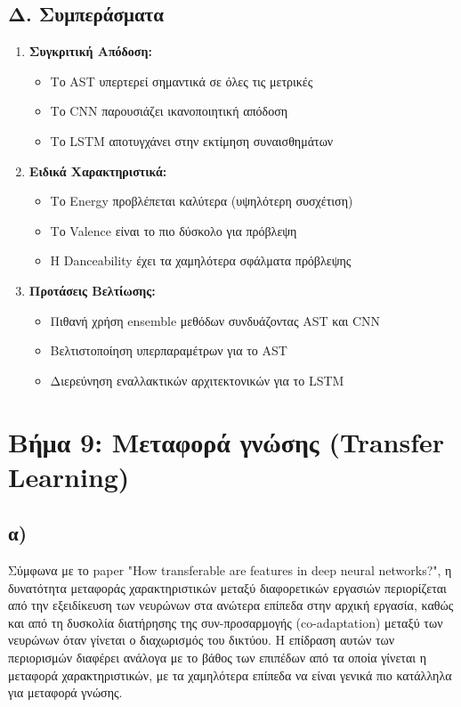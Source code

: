 \documentclass[a4paper,12pt]{article}
\begin{document}
\subsection*{Δ. Συμπεράσματα}

\begin{enumerate}
    \item \textbf{Συγκριτική Απόδοση:}
    \begin{itemize}
        \item Το AST υπερτερεί σημαντικά σε όλες τις μετρικές
        \item Το CNN παρουσιάζει ικανοποιητική απόδοση
        \item Το LSTM αποτυγχάνει στην εκτίμηση συναισθημάτων
    \end{itemize}
    
    \item \textbf{Ειδικά Χαρακτηριστικά:}
    \begin{itemize}
        \item Το Energy προβλέπεται καλύτερα (υψηλότερη συσχέτιση)
        \item Το Valence είναι το πιο δύσκολο για πρόβλεψη
        \item Η Danceability έχει τα χαμηλότερα σφάλματα πρόβλεψης
    \end{itemize}
    
    \item \textbf{Προτάσεις Βελτίωσης:}
    \begin{itemize}
        \item Πιθανή χρήση ensemble μεθόδων συνδυάζοντας AST και CNN
        \item Βελτιστοποίηση υπερπαραμέτρων για το AST
        \item Διερεύνηση εναλλακτικών αρχιτεκτονικών για το LSTM
    \end{itemize}
\end{enumerate}

\section*{Βήμα 9: Μεταφορά γνώσης (Transfer Learning)}

\subsection*{α)}

Σύμφωνα με το paper "How transferable are features in deep neural networks?",
η δυνατότητα μεταφοράς χαρακτηριστικών μεταξύ διαφορετικών εργασιών περιορίζεται από
την εξειδίκευση των νευρώνων στα ανώτερα επίπεδα στην αρχική εργασία, καθώς και από τη
δυσκολία διατήρησης της συν-προσαρμογής (co-adaptation) μεταξύ των νευρώνων όταν γίνεται
ο διαχωρισμός του δικτύου. Η επίδραση αυτών των περιορισμών διαφέρει ανάλογα με το βάθος
των επιπέδων από τα οποία γίνεται η μεταφορά χαρακτηριστικών, με τα χαμηλότερα επίπεδα
να είναι γενικά πιο κατάλληλα για μεταφορά γνώσης.
\end{document}
